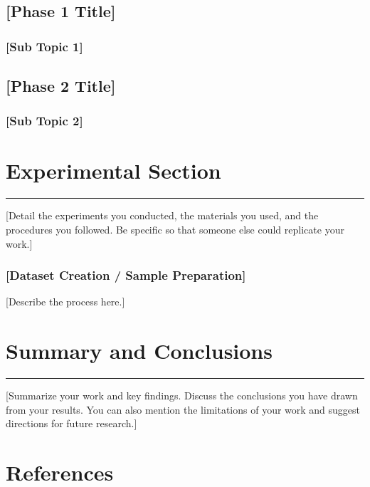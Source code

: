 \documentclass[a4paper, 12pt, twoside]{article}
\begin{document}
\subsection{[Phase 1 Title]}
    \subsubsection{[Sub Topic 1]}

\subsection{[Phase 2 Title]}
\subsubsection{[Sub Topic 2]}

\clearpage

\section{Experimental Section} 
\hrule
\vspace{0.5cm}

[Detail the experiments you conducted, the materials you used, and the procedures you followed. Be specific so that someone else could replicate your work.]

\subsubsection{[Dataset Creation / Sample Preparation]}

[Describe the process here.]

\clearpage

\section{Summary and Conclusions} 
\hrule
\vspace{0.5cm}

[Summarize your work and key findings. Discuss the conclusions you have drawn from your results. You can also mention the limitations of your work and suggest directions for future research.]

\clearpage

\section*{References}
\renewcommand{\refname}{} %
\end{document}
